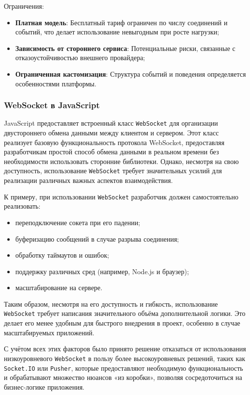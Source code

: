 Ограничения:
\begin{itemize}
  \item \textbf{Платная модель}: Бесплатный тариф ограничен по числу соединений и событий, что делает использование невыгодным при росте нагрузки;
  \item \textbf{Зависимость от стороннего сервиса}: Потенциальные риски, связанные с отказоустойчивостью внешнего провайдера;
  \item \textbf{Ограниченная кастомизация}: Структура событий и поведения определяется особенностями платформы.
\end{itemize}

\subsubsection*{WebSocket в JavaScript}

JavaScript предоставляет встроенный класс \texttt{WebSocket} для организации двустороннего обмена данными между клиентом и сервером. Этот класс реализует базовую функциональность протокола WebSocket, предоставляя разработчикам простой способ обмена данными в реальном времени без необходимости использовать сторонние библиотеки. Однако, несмотря на свою доступность, использование \texttt{WebSocket} требует значительных усилий для реализации различных важных аспектов взаимодействия.

К примеру, при использовании \texttt{WebSocket} разработчик должен самостоятельно реализовать:
\begin{itemize}
  \item переподключение сокета при его падении;
  \item буферизацию сообщений в случае разрыва соединения;
  \item обработку таймаутов и ошибок;
  \item поддержку различных сред (например, Node.js и браузер);
  \item масштабирование на сервере.
\end{itemize}

Таким образом, несмотря на его доступность и гибкость, использование \texttt{WebSocket} требует написания значительного объёма дополнительной логики. Это делает его менее удобным для быстрого внедрения в проект, особенно в случае масштабируемых приложений.

С учётом всех этих факторов было принято решение отказаться от использования низкоуровневого \texttt{WebSocket} в пользу более высокоуровневых решений, таких как \texttt{Socket.IO} или \texttt{Pusher}, которые предоставляют необходимую функциональность и обрабатывают множество нюансов «из коробки», позволяя сосредоточиться на бизнес-логике приложения.


